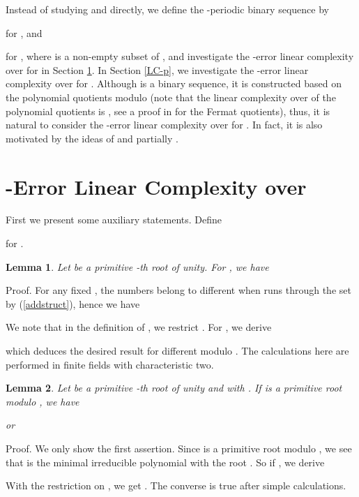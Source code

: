 \documentclass [11pt,a4paper]{article}
\newtheorem{lemma}{Lemma}
\begin{document}
Instead of studying   and  directly, we define the -periodic binary sequence  by

for , and

for , where  is a non-empty subset of , and investigate the -error linear complexity over  for  in Section \ref{LC-2}. In Section \ref{LC-p}, we investigate the -error linear complexity over  for . Although  is a binary sequence, it is constructed based on the polynomial quotients modulo  (note that the linear complexity over  of the polynomial quotients is , see a proof in  \cite{OS} for the Fermat quotients), thus, it is natural to consider the -error linear complexity over  for . In fact, it is also motivated by the ideas of \cite{AMW,AW06} and partially \cite{AM,AW,BW,CY,ESK,GLSW,HKN,HMMS}.



\section{-Error Linear Complexity over }\label{LC-2}

First we present some auxiliary statements. Define

for .

\begin{lemma}\label{lemma-add}
Let  be  a  primitive -th root of
unity. For , we have

\end{lemma}
Proof. For any fixed , the numbers  belong to different  when  runs through the set  by  (\ref{addstruct}), hence we have

 We note that in the definition of , we restrict . For , we derive

which deduces the desired result for different  modulo . The calculations here are performed in
finite fields with characteristic two. ~\hfill 

\begin{lemma}\label{lemma-p}
Let  be  a  primitive -th root of
unity and  with . If   is a
primitive root modulo , we have

or

\end{lemma}
Proof. We only show the first assertion. Since  is a
primitive root modulo , we see that  is the minimal irreducible polynomial with the root .
So if , we derive

With the restriction on , we get . The converse is true after simple calculations.
~\hfill 
\end{document}
